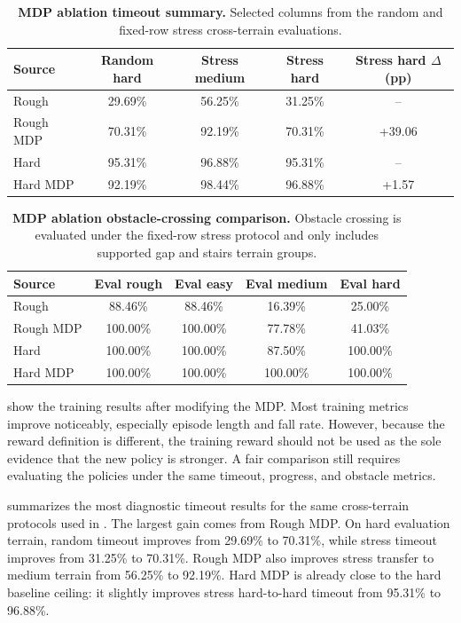 \documentclass{article}
\begin{document}
\begin{table}[t]
    \caption{\textbf{MDP ablation timeout summary.} Selected columns from the random and fixed-row stress cross-terrain evaluations.}
    \label{tab:mdp-timeout-summary}
    \centering
    \begin{tabular}{lcccc}
        \toprule
        Source & Random hard & Stress medium & Stress hard & Stress hard $\Delta$ (pp) \\
        \midrule
        Rough & 29.69\% & 56.25\% & 31.25\% & -- \\
        Rough MDP & 70.31\% & 92.19\% & 70.31\% & +39.06 \\
        Hard & 95.31\% & 96.88\% & 95.31\% & -- \\
        Hard MDP & 92.19\% & 98.44\% & 96.88\% & +1.57 \\
        \bottomrule
    \end{tabular}
\end{table}

\begin{table}[t]
    \caption{\textbf{MDP ablation obstacle-crossing comparison.} Obstacle crossing is evaluated under the fixed-row stress protocol and only includes supported gap and stairs terrain groups.}
    \label{tab:mdp-obstacle}
    \centering
    \begin{tabular}{lcccc}
        \toprule
        Source & Eval rough & Eval easy & Eval medium & Eval hard \\
        \midrule
        Rough & 88.46\% & 88.46\% & 16.39\% & 25.00\% \\
        Rough MDP & 100.00\% & 100.00\% & 77.78\% & 41.03\% \\
        Hard & 100.00\% & 100.00\% & 87.50\% & 100.00\% \\
        Hard MDP & 100.00\% & 100.00\% & 100.00\% & 100.00\% \\
        \bottomrule
    \end{tabular}
\end{table}

 show the training results after modifying the MDP. Most training metrics improve noticeably, especially episode length and fall rate. However, because the reward definition is different, the training reward should not be used as the sole evidence that the new policy is stronger. A fair comparison still requires evaluating the policies under the same timeout, progress, and obstacle metrics.

 summarizes the most diagnostic timeout results for the same cross-terrain protocols used in . The largest gain comes from Rough MDP. On hard evaluation terrain, random timeout improves from 29.69\% to 70.31\%, while stress timeout improves from 31.25\% to 70.31\%. Rough MDP also improves stress transfer to medium terrain from 56.25\% to 92.19\%. Hard MDP is already close to the hard baseline ceiling: it slightly improves stress hard-to-hard timeout from 95.31\% to 96.88\%.
\end{document}
